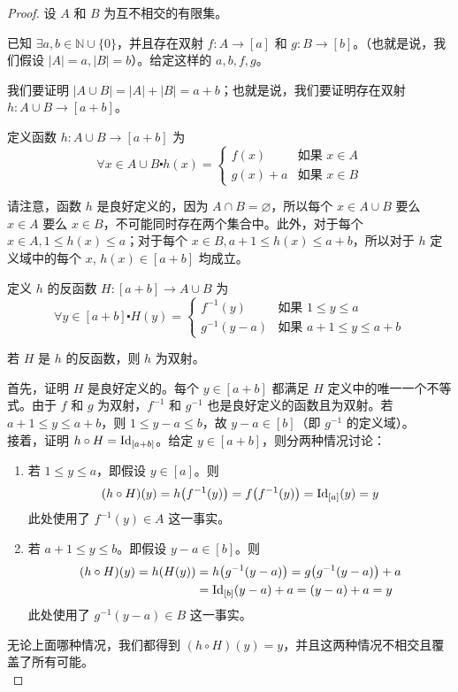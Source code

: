 \begin{proof}
    设 $A$ 和 $B$ 为互不相交的有限集。

    已知 $\exists a, b \in \mathbb{N} \cup \{0\}$，并且存在双射 $f : A \to [a]$ 和 $g : B \to [b]$。（也就是说，我们假设 $|A| = a, |B| = b$）。给定这样的 $a, b, f, g$。

    我们要证明 $|A \cup B| = |A| + |B| = a + b$；也就是说，我们要证明存在双射 $h : A \cup B \to [a + b]$。

    定义函数 $h : A \cup B \to [a + b]$ 为
    \[\forall x \in A \cup B \centerdot h(x) = \begin{cases}
          f(x) & \text{如果\ } x \in A \\
        g(x)+a & \text{如果\ } x \in B
    \end{cases}\]

    请注意，函数 $h$ 是良好定义的，因为 $A \cap B = \varnothing$，所以每个 $x \in A \cup B$ 要么 $x \in A$ 要么 $x \in B$，不可能同时存在两个集合中。此外，对于每个 $x \in A, 1 \le h(x) \le a$；对于每个 $x \in B, a+1 \le h(x) \le a+b$，所以对于 $h$ 定义域中的每个 $x$, $h(x) \in [a+b]$ 均成立。

    定义 $h$ 的反函数 $H : [a + b] \to A \cup B$ 为
    \[\forall y \in [a + b] \centerdot H(y) = \begin{cases}
        f^{-1}(y) & \text{如果\ } 1 \le y \le a \\
        g^{-1}(y-a) & \text{如果\ } a+1 \le y \le a+b
    \end{cases}\]

    若 $H$ 是 $h$ 的反函数，则 $h$ 为双射。

    首先，证明 $H$ 是良好定义的。每个 $y \in [a + b]$ 都满足 $H$ 定义中的唯一一个不等式。由于 $f$ 和 $g$ 为双射，$f^{-1}$ 和 $g^{-1}$ 也是良好定义的函数且为双射。若 $a + 1 \le y \le a + b$，则 $1 \le y - a \le b$，故 $y - a \in [b]$（即 $g^{-1}$ 的定义域）。\\

    接着，证明 $h \circ H = \text{Id}_{[a+b]}$。给定 $y \in [a+b]$，则分两种情况讨论：
    \begin{enumerate}[label=(\arabic*)]
        \item 若 $1 \le y \le a$，即假设 $y \in [a]$。则
            \[(h \circ H)(y) = h\big(f^{-1}(y)\big) = f\big(f^{-1}(y)\big)= \text{Id}_{[a]}(y) = y\]
            此处使用了 $f^{-1}(y) \in A$ 这一事实。
        \item 若 $a + 1 \le y \le b$。即假设 $y-a \in [b]$。则
            \begin{align*}
                (h \circ H)(y) = h(H(y)) &= h\big(g^{-1}(y-a)\big) = g\big(g^{-1}(y-a)\big)+a \\
                &= \text{Id}_{[b]}(y - a) + a = (y - a) + a = y
            \end{align*}
            此处使用了 $g^{-1}(y - a) \in B$ 这一事实。
    \end{enumerate}
    无论上面哪种情况，我们都得到 $(h \circ H)(y) = y$，并且这两种情况不相交且覆盖了所有可能。\\


\end{proof}

